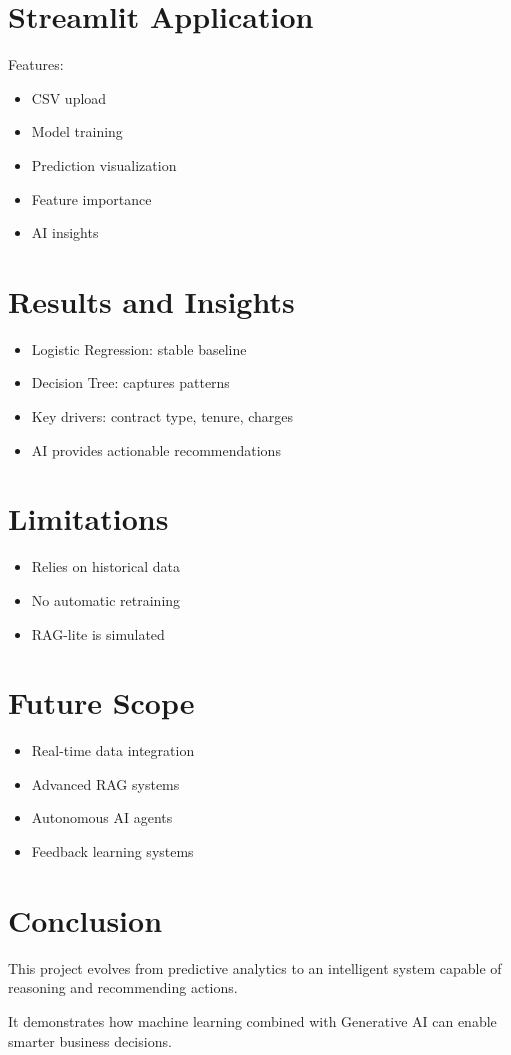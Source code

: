 \documentclass[12pt]{article}
\begin{document}
\section{Streamlit Application}

Features:
\begin{itemize}
\item CSV upload
\item Model training
\item Prediction visualization
\item Feature importance
\item AI insights
\end{itemize}

\section{Results and Insights}

\begin{itemize}
\item Logistic Regression: stable baseline
\item Decision Tree: captures patterns
\item Key drivers: contract type, tenure, charges
\item AI provides actionable recommendations
\end{itemize}

\section{Limitations}

\begin{itemize}
\item Relies on historical data
\item No automatic retraining
\item RAG-lite is simulated
\end{itemize}

\section{Future Scope}

\begin{itemize}
\item Real-time data integration
\item Advanced RAG systems
\item Autonomous AI agents
\item Feedback learning systems
\end{itemize}

\section{Conclusion}

This project evolves from predictive analytics to an intelligent system capable of reasoning and recommending actions.

It demonstrates how machine learning combined with Generative AI can enable smarter business decisions.
\end{document}
